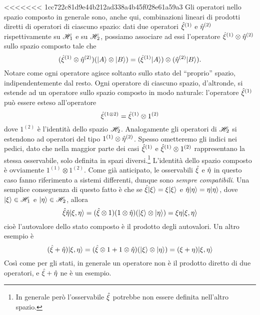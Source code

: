 <<<<<<< 1cc722c81d9e44b212ad338a4b45f028e61a59a3
Gli operatori nello spazio composto in generale sono, anche qui, combinazioni lineari di prodotti diretti di operatori di ciascuno spazio: dati due operatori $\hat{\xi}^{(1)}$ e $\hat{\eta}^{(2)}$ rispettivamente su $\mathscr H_1$ e su $\mathscr H_2$, possiamo associare ad essi l'operatore $\hat{\xi}^{(1)}\otimes\hat{\eta}^{(2)}$ sullo spazio composto tale che
\begin{equation}
	(\hat{\xi}^{(1)}\otimes\hat{\eta}^{(2)})(\lvert A\rangle\otimes\lvert B\rangle)=(\hat{\xi}^{(1)}\lvert A\rangle)\otimes(\hat{\eta}^{(2)}\lvert B\rangle).
\end{equation}
Notare come ogni operatore agisce soltanto sullo stato del ``proprio'' spazio, indipendentemente dal resto.
Ogni operatore di ciascuno spazio, d'altronde, si estende ad un operatore sullo spazio composto in modo naturale: l'operatore $\hat{\xi}^{(1)}$ può essere esteso all'operatore
\begin{equation}
	\hat{\xi}^{(1\otimes 2)}=\hat{\xi}^{(1)}\otimes 1^{(2)}
    \label{eq:estensione-operatore-singola-particella}
\end{equation}
dove $1^{(2)}$ è l'identità dello spazio $\mathscr H_2$.
Analogamente gli operatori di $\mathscr H_2$ si estendono ad operatori del tipo $1^{(1)}\otimes\hat{\eta}^{(2)}$.
Spesso ometteremo gli indici nei pedici, dato che nella maggior parte dei casi $\hat{\xi}^{(1)}$ e $\hat{\xi}^{(1)}\otimes 1^{(2)}$ rappresentano la stessa osservabile, solo definita in spazi diversi.\footnote{
	In generale però l'osservabile $\hat{\xi}$ potrebbe non essere definita nell'altro spazio.
}
L'identità dello spazio composto è ovviamente $1^{(1)}\otimes 1^{(2)}$.
Come già anticipato, le osservabili $\hat{\xi}$ e $\hat{\eta}$ in questo caso fanno riferimento a sistemi differenti, dunque sono \emph{sempre compatibili}.
Una semplice conseguenza di questo fatto è che se $\hat{\xi}\lvert\xi\rangle=\xi\lvert\xi\rangle$ e $\hat{\eta}\lvert\eta\rangle=\eta\lvert\eta\rangle$, dove $\lvert\xi\rangle\in\mathscr H_1$ e $\lvert\eta\rangle\in\mathscr H_2$, allora
\begin{equation}
	\hat{\xi}\hat{\eta}\lvert\xi,\eta\rangle=(\hat{\xi}\otimes 1)(1\otimes\hat{\eta})(\lvert\xi\rangle\otimes\lvert\eta\rangle)=\xi\eta\lvert\xi,\eta\rangle
\end{equation}
cioè l'autovalore dello stato composto è il prodotto degli autovalori.
Un altro esempio è
\begin{equation}
	(\hat{\xi}+\hat{\eta})\lvert\xi,\eta\rangle=(\hat{\xi}\otimes 1+1\otimes\hat{\eta})(\lvert\xi\rangle\otimes\lvert\eta\rangle)=(\xi+\eta)\lvert\xi,\eta\rangle
\end{equation}
Cos\`i come per gli stati, in generale un operatore non è il prodotto diretto di due operatori, e $\hat{\xi}+\hat{\eta}$ ne è un esempio.

